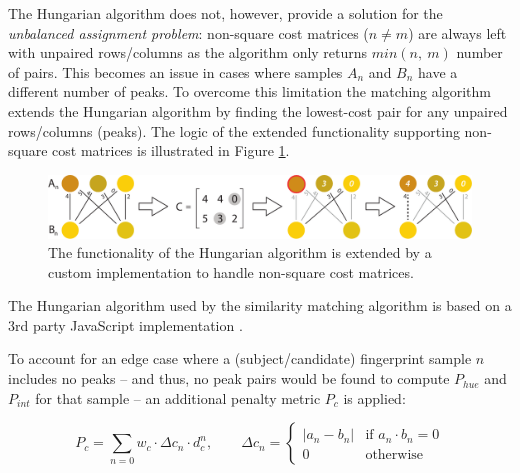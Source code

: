 \documentclass[thesis.tex]{subfiles}
\begin{document}
The Hungarian algorithm does not, however, provide a solution for the \emph{unbalanced assignment problem}: non-square cost matrices ($n \neq m$) are always left with unpaired rows/columns as the algorithm only returns $min (n,\ m)$ number of pairs. This becomes an issue in cases where samples $A_n$ and $B_n$ have a different number of peaks. To overcome this limitation the matching algorithm extends the Hungarian algorithm by finding the lowest-cost pair for any unpaired rows/columns (peaks). The logic of the extended functionality supporting non-square cost matrices is illustrated in Figure \ref{figure:hungarian-algorithm-extended}.

\begin{figure}[h]
\centering \includegraphics[width=\textwidth,height=\textheight,keepaspectratio=true]{images/design_implementation/hungarian_algorithm_ext}
\caption{The functionality of the Hungarian algorithm is extended by a custom implementation to handle non-square cost matrices.\label{figure:hungarian-algorithm-extended}}
\end{figure}

\noindent The Hungarian algorithm used by the similarity matching algorithm is based on a 3rd party JavaScript implementation \cite{munkres-js}.

To account for an edge case where a (subject/candidate) fingerprint sample $n$ includes no peaks -- and thus, no peak pairs would be found to compute $P_{hue}$ and $P_{int}$ for that sample -- an additional penalty metric $P_c$ is applied:

\begin{equation}
\label{equation:similarity-metric-no-peaks}
P_c = \sum \limits_{n=0} { w_c \cdot \Delta{c_n} \cdot d_c^n }, \qquad
\Delta{c_n} = \begin{cases}
|a_n - b_n| &\text{if $a_n \cdot b_n = 0$}\\
0 &\text{otherwise}
\end{cases}
\end{equation}
\end{document}
